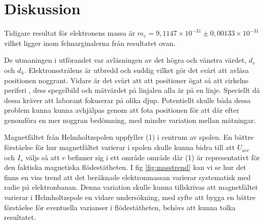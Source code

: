 \documentclass{article}
\begin{document}
\section*{Diskussion}
Tidigare resultat för elektronens massa är $m_e=9,1147\times 10^{-31} \pm 0,00133\times10^{-31}$ \cite{cohen1952rydberg} vilket ligger inom felmarginalerna från resultatet ovan.

De utmaningen i utförandet var avläsningen av det högra och vänstra värdet, $d_v$ och $d_h$. Elektronsstrålens är utbredd och suddig vilket gör det svårt att avläsa positionen noggrant. Vidare är det svårt att att positioner ögat så att cirkelns periferi , dess spegelbild och mätvärdet på linjalen alla är på en linje. Speciellt då dessa kräver att laborant fokuserar på olika djup. Potentiellt skulle båda dessa problem kunna kunna avhjälpas genom att fota positionen för att där efter genomföra en mer noggran bedömning, med mindre variation mellan mätningar. 

Magnetfältet från Helmholtzspolen uppfyller (1) i centrum av spolen\cite{anderson1999design}. En bättre förståelse för hur magnetfältet varierar i spolen skulle kunna bidra till att $U_{acc}$ och $I_s$ väljs så att $r$ befinner sig i ett område område där (1) är representativt för den faktiska magnetiska flödestätheten. I fig \ref{fig:masstrend} kan vi se hur det finns en viss trend att det beräknade elektronmassan varierar systematisk med radie på elektronbanan. Denna variation skulle kunna tillskrivas att magnetfältet varierar i Helmholtzspole en vidare undersökning, med syfte att bygga en bättre förståelse för eventuella varianser i flödestätheten, behövs att kunna tolka resultatet.

\newpage


\end{document}
